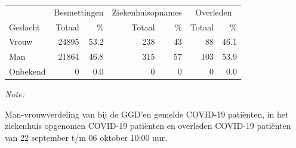 \documentclass[
  english,
  man,floatsintext]{apa6}
\begin{document}
\begin{table}[H]
\centering\begingroup\fontsize{11}{13}\selectfont

\begin{threeparttable}
\begin{tabular}{lrrrrrr}
\toprule
\multicolumn{1}{c}{ } & \multicolumn{2}{c}{Besmettingen} & \multicolumn{2}{c}{Ziekenhuisopnames} & \multicolumn{2}{c}{Overleden} \\
\cmidrule(l{3pt}r{3pt}){2-3} \cmidrule(l{3pt}r{3pt}){4-5} \cmidrule(l{3pt}r{3pt}){6-7}
Geslacht & Totaal & \% & Totaal & \% & Totaal & \%\\
\midrule
Vrouw & 24895 & 53.2 & 238 & 43 & 88 & 46.1\\
Man & 21864 & 46.8 & 315 & 57 & 103 & 53.9\\
Onbekend & 0 & 0.0 & 0 & 0 & 0 & 0.0\\
\bottomrule
\end{tabular}
\begin{tablenotes}
\item \textit{Note: } 
\item Man-vrouwverdeling van bij de GGD’en gemelde COVID-19 patiënten, in het ziekenhuis opgenomen COVID-19 patiënten en overleden COVID-19 patiënten van 22 september t/m 06 oktober 10:00 uur.
\end{tablenotes}
\end{threeparttable}
\endgroup{}
\end{table}
\newpage
\end{document}
